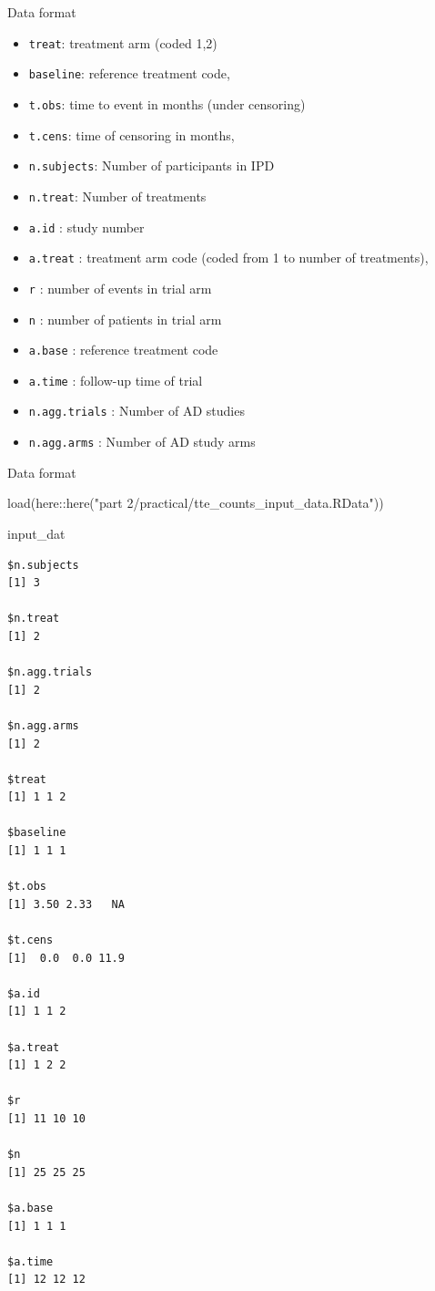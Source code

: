 \documentclass[
  ignorenonframetext,
]{beamer}
\newenvironment{Shaded}{\begin{snugshade}}{\end{snugshade}}
\newcommand{\FunctionTok}[1]{\textcolor[rgb]{0.28,0.35,0.67}{#1}}
\newcommand{\NormalTok}[1]{\textcolor[rgb]{0.00,0.23,0.31}{#1}}
\newcommand{\SpecialCharTok}[1]{\textcolor[rgb]{0.37,0.37,0.37}{#1}}
\newcommand{\StringTok}[1]{\textcolor[rgb]{0.13,0.47,0.30}{#1}}
\begin{document}
\begin{frame}[fragile]{Data format}
\protect\hypertarget{data-format}{}
\begin{itemize}
\item
  \texttt{treat}: treatment arm (coded 1,2)
\item
  \texttt{baseline}: reference treatment code,
\item
  \texttt{t.obs}: time to event in months (under censoring)
\item
  \texttt{t.cens}: time of censoring in months,
\item
  \texttt{n.subjects}: Number of participants in IPD
\item
  \texttt{n.treat}: Number of treatments
\item
  \texttt{a.id} : study number
\item
  \texttt{a.treat} : treatment arm code (coded from 1 to number of
  treatments),
\item
  \texttt{r} : number of events in trial arm
\item
  \texttt{n} : number of patients in trial arm
\item
  \texttt{a.base} : reference treatment code
\item
  \texttt{a.time} : follow-up time of trial
\item
  \texttt{n.agg.trials} : Number of AD studies
\item
  \texttt{n.agg.arms} : Number of AD study arms
\end{itemize}
\end{frame}

\begin{frame}[fragile]{Data format}
\protect\hypertarget{data-format-1}{}
\begin{Shaded}
\begin{Highlighting}[]
\FunctionTok{load}\NormalTok{(here}\SpecialCharTok{::}\FunctionTok{here}\NormalTok{(}\StringTok{"part 2/practical/tte\_counts\_input\_data.RData"}\NormalTok{))}

\NormalTok{input\_dat}
\end{Highlighting}
\end{Shaded}

\begin{verbatim}
$n.subjects
[1] 3

$n.treat
[1] 2

$n.agg.trials
[1] 2

$n.agg.arms
[1] 2

$treat
[1] 1 1 2

$baseline
[1] 1 1 1

$t.obs
[1] 3.50 2.33   NA

$t.cens
[1]  0.0  0.0 11.9

$a.id
[1] 1 1 2

$a.treat
[1] 1 2 2

$r
[1] 11 10 10

$n
[1] 25 25 25

$a.base
[1] 1 1 1

$a.time
[1] 12 12 12
\end{verbatim}
\end{frame}
\end{document}
